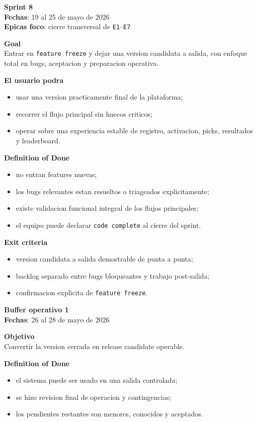 \begin{docnote}
\textbf{Sprint 8}\\
\textbf{Fechas}: 19 al 25 de mayo de 2026\\
\textbf{Epicas foco}: cierre transversal de \texttt{E1}--\texttt{E7}

\textbf{Goal}\\
Entrar en \texttt{feature freeze} y dejar una version candidata a salida, con enfoque total en bugs, aceptacion y preparacion operativa.

\textbf{El usuario podra}\\
\begin{itemize}
  \item usar una version practicamente final de la plataforma;
  \item recorrer el flujo principal sin huecos criticos;
  \item operar sobre una experiencia estable de registro, activacion, picks, resultados y leaderboard.
\end{itemize}

\textbf{Definition of Done}\\
\begin{itemize}
  \item no entran features nuevas;
  \item los bugs relevantes estan resueltos o triageados explicitamente;
  \item existe validacion funcional integral de los flujos principales;
  \item el equipo puede declarar \texttt{code complete} al cierre del sprint.
\end{itemize}

\textbf{Exit criteria}\\
\begin{itemize}
  \item version candidata a salida demostrable de punta a punta;
  \item backlog separado entre bugs bloqueantes y trabajo post-salida;
  \item confirmacion explicita de \texttt{feature freeze}.
\end{itemize}
\end{docnote}

\begin{docnote}
\textbf{Buffer operativo 1}\\
\textbf{Fechas}: 26 al 28 de mayo de 2026

\textbf{Objetivo}\\
Convertir la version cerrada en release candidate operable.

\textbf{Definition of Done}\\
\begin{itemize}
  \item el sistema puede ser usado en una salida controlada;
  \item se hizo revision final de operacion y contingencias;
  \item los pendientes restantes son menores, conocidos y aceptados.
\end{itemize}
\end{docnote}

